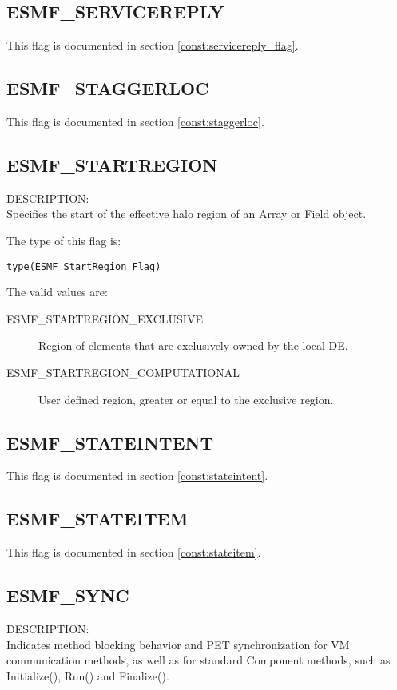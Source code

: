 \subsection{ESMF\_SERVICEREPLY}
This flag is documented in section \ref{const:servicereply_flag}.

\subsection{ESMF\_STAGGERLOC}
This flag is documented in section \ref{const:staggerloc}.

\subsection{ESMF\_STARTREGION}
\label{const:startregion}
{\sf DESCRIPTION:\\}
Specifies the start of the effective halo region of an Array or Field object.

The type of this flag is:

{\tt type(ESMF\_StartRegion\_Flag)}

The valid values are:
\begin{description}
\item [ESMF\_STARTREGION\_EXCLUSIVE]
      Region of elements that are exclusively owned by the local DE.
\item [ESMF\_STARTREGION\_COMPUTATIONAL]
      User defined region, greater or equal to the exclusive region.
\end{description}

\subsection{ESMF\_STATEINTENT}
This flag is documented in section \ref{const:stateintent}.

\subsection{ESMF\_STATEITEM}
This flag is documented in section \ref{const:stateitem}.

\subsection{ESMF\_SYNC}
\label{const:sync}
{\sf DESCRIPTION:\\}  
Indicates method blocking behavior and PET synchronization for VM communication
methods, as well as for standard Component methods, such as Initialize(), Run() 
and Finalize().

